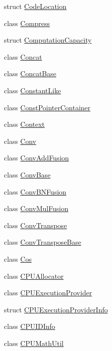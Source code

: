 \begin{DoxyCompactItemize}
\item 
struct \mbox{\hyperlink{structonnxruntime_1_1CodeLocation}{Code\+Location}}
\item 
class \mbox{\hyperlink{classonnxruntime_1_1Compress}{Compress}}
\item 
struct \mbox{\hyperlink{structonnxruntime_1_1ComputationCapacity}{Computation\+Capacity}}
\item 
class \mbox{\hyperlink{classonnxruntime_1_1Concat}{Concat}}
\item 
class \mbox{\hyperlink{classonnxruntime_1_1ConcatBase}{Concat\+Base}}
\item 
class \mbox{\hyperlink{classonnxruntime_1_1ConstantLike}{Constant\+Like}}
\item 
class \mbox{\hyperlink{classonnxruntime_1_1ConstPointerContainer}{Const\+Pointer\+Container}}
\item 
class \mbox{\hyperlink{classonnxruntime_1_1Context}{Context}}
\item 
class \mbox{\hyperlink{classonnxruntime_1_1Conv}{Conv}}
\item 
class \mbox{\hyperlink{classonnxruntime_1_1ConvAddFusion}{Conv\+Add\+Fusion}}
\item 
class \mbox{\hyperlink{classonnxruntime_1_1ConvBase}{Conv\+Base}}
\item 
class \mbox{\hyperlink{classonnxruntime_1_1ConvBNFusion}{Conv\+B\+N\+Fusion}}
\item 
class \mbox{\hyperlink{classonnxruntime_1_1ConvMulFusion}{Conv\+Mul\+Fusion}}
\item 
class \mbox{\hyperlink{classonnxruntime_1_1ConvTranspose}{Conv\+Transpose}}
\item 
class \mbox{\hyperlink{classonnxruntime_1_1ConvTransposeBase}{Conv\+Transpose\+Base}}
\item 
class \mbox{\hyperlink{classonnxruntime_1_1Cos}{Cos}}
\item 
class \mbox{\hyperlink{classonnxruntime_1_1CPUAllocator}{C\+P\+U\+Allocator}}
\item 
class \mbox{\hyperlink{classonnxruntime_1_1CPUExecutionProvider}{C\+P\+U\+Execution\+Provider}}
\item 
struct \mbox{\hyperlink{structonnxruntime_1_1CPUExecutionProviderInfo}{C\+P\+U\+Execution\+Provider\+Info}}
\item 
class \mbox{\hyperlink{classonnxruntime_1_1CPUIDInfo}{C\+P\+U\+I\+D\+Info}}
\item 
class \mbox{\hyperlink{classonnxruntime_1_1CPUMathUtil}{C\+P\+U\+Math\+Util}}
\item 

\end{DoxyCompactItemize}
